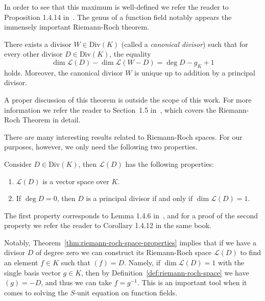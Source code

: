 In order to see that this maximum is well-defined we refer the reader to Proposition 1.4.14 in~\cite{stichtenoth-2009-algebraic-function-fields}. The genus of a function field notably appears the immensely important Riemann-Roch theorem.

\begin{theorem}
  There exists a divisor \(W \in \mathrm{Div}(K)\) (called a \textit{canonical divisor}) such that for every other divisor \(D \in \mathrm{Div}(K)\), the equality
  \[\dim{\mathcal{L}(D)} - \dim{\mathcal{L}(W - D)} = \deg{D} - g_{K} + 1\]
  holds. Moreover, the canonical divisor \(W\) is unique up to addition by a principal divisor.
\end{theorem}

A proper discussion of this theorem is outside the scope of this work. For more information we refer the reader to Section~1.5 in~\cite{stichtenoth-2009-algebraic-function-fields}, which covers the Riemann-Roch Theorem in detail.

There are many interesting results related to Riemann-Roch spaces. For our purposes, however, we only need the following two properties.

\begin{theorem}%
  \label{thm:riemann-roch-space-properties}
  Consider \(D \in \mathrm{Div}(K)\), then \(\mathcal{L}(D)\) has the following properties:
  \begin{enumerate}[label = {(\arabic*)}]
    \item%
      \label{prop:vector-space}
      \(\mathcal{L}(D)\) is a vector space over \(K\).

    \item%
      \label{prop:principal-dimension}
      If \(\deg{D} = 0\), then \(D\) is a principal divisor if and only if \(\dim{\mathcal{L}(D)} = 1\).
  \end{enumerate}
\end{theorem}

The first property corresponds to Lemma 1.4.6 in~\cite{stichtenoth-2009-algebraic-function-fields}, and for a proof of the second property we refer the reader to Corollary 1.4.12 in the same book.

Notably, Theorem~\ref{thm:riemann-roch-space-properties} implies that if we have a divisor \(D\) of degree zero we can construct its Riemann-Roch space \(\mathcal{L}(D)\) to find an element \(f \in K\) such that \((f) = D\). Namely, if \(\dim{\mathcal{L}(D)} = 1\) with the single basis vector \(g \in K\), then by Definition~\ref{def:riemann-roch-space} we have \((g) = -D\), and thus we can take \(f = g^{-1}\). This is an important tool when it comes to solving the \(S\)-unit equation on function fields.

